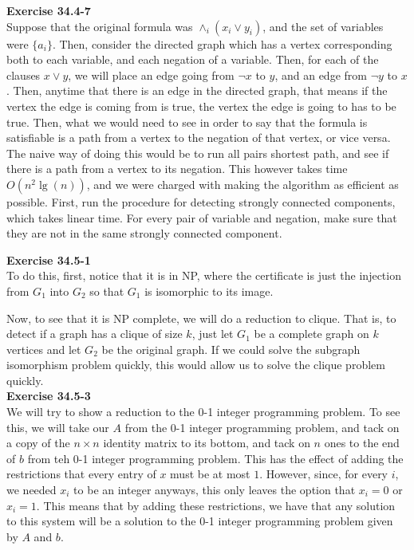 \documentclass{article}
\begin{document}
\noindent\textbf{Exercise 34.4-7}\\
Suppose that the original formula was $\wedge_i (x_i \vee y_i)$, and the set of variables were $\{a_i\}$. Then, consider the directed graph which has a vertex corresponding both to each variable, and each negation of a variable. Then, for each of the clauses $x \vee y$, we will place an edge going from $\neg x$ to $y$, and an edge from $\neg y$ to $x$. Then, anytime that there is an edge in the directed graph, that means if the vertex the edge is coming from is true, the vertex the edge is going to has to be true. Then, what we would need to see in order to say that the formula is satisfiable is a path from a vertex to the negation of that vertex, or vice versa. The naive way of doing this would be to run all pairs shortest path, and see if there is a path from a vertex to its negation. This however takes time $O(n^2\lg(n))$, and we were charged with making the algorithm as efficient as possible. First, run the procedure for detecting strongly connected components, which takes linear time. For every pair of variable and negation, make sure that they are not in the same strongly connected component.%



\noindent\textbf{Exercise 34.5-1}\\

To do this, first, notice that it is in NP, where the certificate is just the injection from $G_1$ into $G_2$ so that $G_1$ is isomorphic to its image.

Now, to see that it is NP complete, we will do a reduction to clique. That is, to detect if a graph has a clique of size $k$, just let $G_1$ be a complete graph on $k$ vertices and let $G_2$ be the original graph. If we could solve the subgraph isomorphism problem quickly, this would allow us to solve the clique problem quickly.\\



\noindent\textbf{Exercise 34.5-3}\\

We will try to show a reduction to the 0-1 integer programming problem. To see this, we will take our $A$ from the 0-1 integer programming problem, and tack on a copy of the $n\times n$ identity matrix to its bottom, and tack on $n$ ones to the end of $b$ from teh 0-1 integer programming problem. This has the effect of adding the restrictions that every entry of $x$ must be at most $1$. However, since, for every $i$, we needed $x_i$ to be an integer anyways, this only leaves the option that $x_i=0$ or $x_i=1$. This means that by adding these restrictions, we have that any solution to this system will be a solution to the 0-1 integer programming problem given by $A$ and $b$.\\
\end{document}

